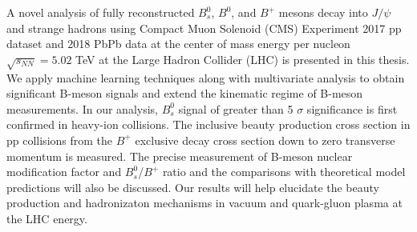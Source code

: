 % 
% 
%
A novel analysis of fully reconstructed $B^0_s$, $B^0$, and $B^+$ mesons decay into $J/\psi$ and strange hadrons using Compact Muon Solenoid (CMS) Experiment 2017 pp dataset and 2018 PbPb data at the center of mass energy per nucleon $\sqrt{s_{NN}} = 5.02$ TeV at the Large Hadron Collider (LHC) is presented in this thesis. We apply machine learning techniques along with multivariate analysis to obtain significant B-meson signals and extend the kinematic regime of B-meson measurements. In our analysis, $B^0_s$ signal of greater than 5 $\sigma$ significance is first confirmed in heavy-ion collisions. The inclusive beauty production cross section in pp collisions from the $B^+$ exclusive decay cross section down to zero transverse momentum is measured. The precise measurement of B-meson nuclear modification factor and $B^0_s$/$B^+$ ratio and the comparisons with theoretical model predictions will also be discussed. Our results will help elucidate the beauty production and hadronizaton mechanisms in vacuum and quark-gluon plasma at the LHC energy. 